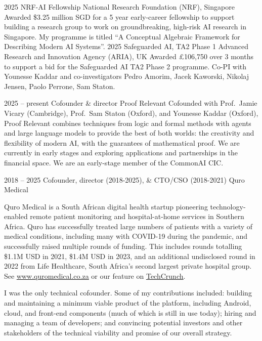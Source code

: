 \documentclass[9pt]{developercv} %
\begin{document}
\begin{entrylist}
    \entry
    {2025}
    {NRF-AI Fellowship }
    {National Research Foundation (NRF), Singapore}
    {Awarded \$3.25 million SGD for a 5 year early-career fellowship to support building a research group to work on groundbreaking, high-risk AI research in Singapore. My programme is titled ``A Conceptual Algebraic Framework for Describing Modern AI Systems''.}
    \entry
    {2025}
    {Safeguarded AI, TA2 Phase 1 }
    {Advanced Research and Innovation Agency (ARIA), UK}
    {Awarded £106,750 over 3 months to support a bid for the Safeguarded AI TA2 Phase 2 programme. Co-PI with Younesse Kaddar and co-investigators Pedro Amorim, Jacek Kaworski, Nikolaj Jensen, Paolo Perrone, Sam Staton.}
\end{entrylist}


\begin{entrylist}
    \entry
        {2025 -- present}
        {Cofounder \& director}
        {Proof Relevant}
        {Cofounded with Prof.\ Jamie Vicary (Cambridge), Prof.\ Sam Staton (Oxford), and Younesse Kaddar (Oxford), Proof Relevant combines techniques from logic and formal methods with agents and large language models to provide the best of both worlds: the creativity and flexibility of modern AI, with the guarantees of mathematical proof. We are currently in early stages and exploring applications and partnerships in the financial space. We are an early-stage member of the CommonAI CIC.}

    \entry
        {2018 -- 2025}%
        {Cofounder, director (2018-2025), \& CTO/CSO (2018-2021)}
        {Quro Medical}
        {Quro Medical is a South African digital health startup pioneering technology-enabled remote patient monitoring and hospital-at-home services in Southern Africa.
        Quro has successfully treated large numbers of patients with a variety of medical conditions, including many with COVID-19 during the pandemic, and successfully raised multiple rounds of funding.
        This includes rounds totalling \$1.1M USD in 2021, \$1.4M USD in 2023, and an additional undisclosed round in 2022 from Life Healthcare, South Africa’s second largest private hospital group.
        See \underline{\href{https://www.quromedical.co.za}{www.quromedical.co.za}} or our feature on \underline{\href{https://techcrunch.com/2021/04/14/south-africas-quro-medical-comes-out-of-stealth-with-1-1m-to-expand-its-hospital-at-home-service/}{TechCrunch}}.

        \vspace{1em}
        I was the only technical cofounder.
        Some of my contributions included: building and maintaining a minimum viable product of the platform, including Android, cloud, and front-end components (much of which is still in use today); hiring and managing a team of developers; and convincing potential investors and other stakeholders of the technical viability and promise of our overall strategy.}
\end{entrylist}
\end{document}
